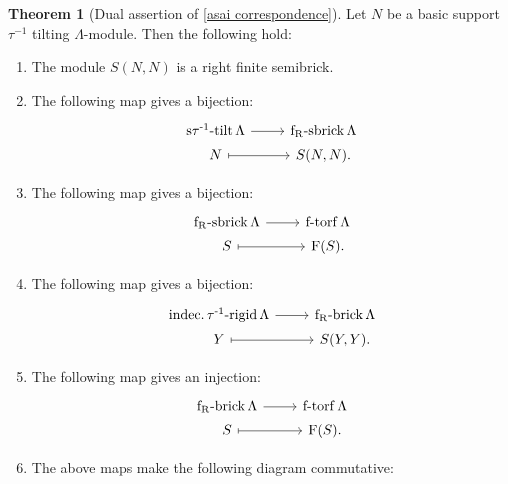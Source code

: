 \documentclass[pdftex,a4paper]{article}
\numberwithin{equation}{subsection}
\theoremstyle{definition}
\newtheorem{theorem}{Theorem}[section]
\newcommand{\itauirigid}{\operatorname{\mathrm{indec.\tau^{-1}-rigid}}}
\newcommand{\stauitilt}{\operatorname{\mathrm{s\tau^{-1}-tilt}}}
\newcommand{\ftorf}{\operatorname{\mathrm{f-torf}}}
\newcommand{\frsbrick}{\operatorname{\mathrm{f_R-sbrick}}}
\newcommand{\frbrick}{\operatorname{\mathrm{f_R-brick}}}
\newcommand{\torfcl}{\operatorname{\mathrm{F}}}
\begin{document}
\begin{theorem}
	[{Dual assertion of \cref{asai correspondence}}]\label{dasai correspondence 2021-09-24 13:18:33}
	Let \(N\) be a basic support \(\tau^{-1}\) tilting \(\Lambda\)-module. Then the following hold:
	\begin{enumerate}
		\item The module \(S(N,N)\) is a right finite semibrick.
		\item The following map gives a bijection:
		      \begin{equation}\label{dasaicorresp 2021-09-24 13:16:37}
			      \begin{tikzcd}[row sep=1pt]
				      \stauitilt \Lambda \ar[r]& \frsbrick \Lambda\\
				      N \ar[r,mapsto]& S(N,N).
			      \end{tikzcd}
		      \end{equation}
		\item The following map gives a bijection:
		      \begin{equation}\label{FF 2021-09-24 13:16:03}
			      \begin{tikzcd}[row sep=1pt]
				      \frsbrick \Lambda \ar[r]& \ftorf \Lambda\\
				      S \ar[r,mapsto]& \torfcl(S).
			      \end{tikzcd}
		      \end{equation}
		\item The following map gives a bijection:
		      \begin{equation}\label{2021-09-24 13:13:50}
			      \begin{tikzcd}[row sep=1pt]
				      \itauirigid \Lambda \ar[r] &\frbrick \Lambda\\
				      Y \ar[r,mapsto]& S(Y,Y).
			      \end{tikzcd}
		      \end{equation}
		\item The following map gives an injection:
		      \begin{equation}\label{2021-09-24 13:14:13}
			      \begin{tikzcd}[row sep=1pt]
				      \frbrick \Lambda \ar[r] &\ftorf \Lambda\\
				      S \ar[r,mapsto]& \torfcl (S).
			      \end{tikzcd}
		      \end{equation}
		\item The above maps make the following diagram commutative:
		      \begin{equation}

\end{equation}
\end{enumerate}
\end{theorem}
\end{document}
